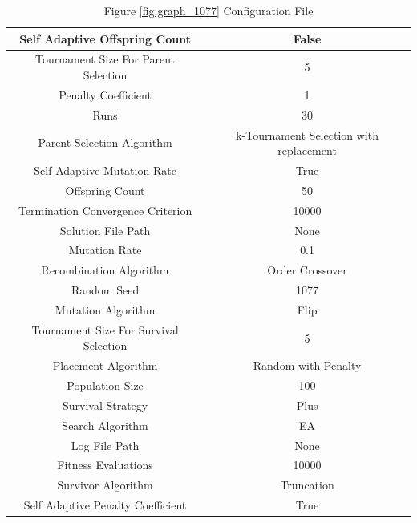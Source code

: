 \documentclass{standalone}
\begin{document}
\begin{table}[!htb]
	\centering
	\caption{Figure \ref{fig:graph_1077} Configuration File}
	\label{tab:graph_1077}
	\begin{tabular}{| c | c |}
		\hline
		Self Adaptive Offspring Count		& False		 \\
		\hline
		Tournament Size For Parent Selection		& 5		 \\
		\hline
		Penalty Coefficient		& 1		 \\
		\hline
		Runs		& 30		 \\
		\hline
		Parent Selection Algorithm		& k-Tournament Selection with replacement		 \\
		\hline
		Self Adaptive Mutation Rate		& True		 \\
		\hline
		Offspring Count		& 50		 \\
		\hline
		Termination Convergence Criterion		& 10000		 \\
		\hline
		Solution File Path		& None		 \\
		\hline
		Mutation Rate		& 0.1		 \\
		\hline
		Recombination Algorithm		& Order Crossover		 \\
		\hline
		Random Seed		& 1077		 \\
		\hline
		Mutation Algorithm		& Flip		 \\
		\hline
		Tournament Size For Survival Selection		& 5		 \\
		\hline
		Placement Algorithm		& Random with Penalty		 \\
		\hline
		Population Size		& 100		 \\
		\hline
		Survival Strategy		& Plus		 \\
		\hline
		Search Algorithm		& EA		 \\
		\hline
		Log File Path		& None		 \\
		\hline
		Fitness Evaluations		& 10000		 \\
		\hline
		Survivor Algorithm		& Truncation		 \\
		\hline
		Self Adaptive Penalty Coefficient		& True		 \\
		\hline
	\end{tabular}
\end{table}
\end{document}
